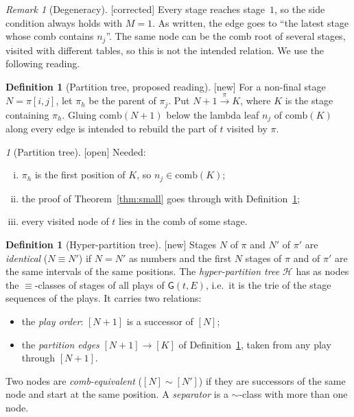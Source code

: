 \documentclass[11pt]{article}
\newcommand{\Gm}{\mathsf{G}}
\newcommand{\iv}[2]{\pi[#1,#2]}
\newcommand{\comb}{\mathrm{comb}}
\newcommand{\ra}[1]{\xrightarrow{#1}}
\newcommand{\Fixed}{\textsf{[corrected]}}
\newcommand{\New}{\textsf{[new]}}
\newcommand{\Open}{\textsf{\color{red!60!black}[open]}}
\theoremstyle{plain}
\theoremstyle{definition}
\newtheorem{definition}[theorem]{Definition}
\theoremstyle{remark}
\newtheorem{remark}[theorem]{Remark}
\newtheorem*{gapenv}{\gapname}
\newcommand{\gapname}{Gap}
\begin{document}
\begin{remark}[Degeneracy]\label{rem:ptree}
\Fixed{} Every stage reaches stage~$1$, so the side condition always
holds with $M=1$.  As written, the edge goes to ``the latest stage whose
comb contains $n_j$''.  The same node can be the comb root of several
stages, visited with different tables, so this is not the intended
relation.  We use the following reading.
\end{remark}

\begin{definition}[Partition tree, proposed reading]\label{def:ptree2}
\New{} For a non-final stage $N=\iv ij$, let $\pi_h$ be the parent of
$\pi_j$.  Put $N+1\ra\pi K$, where $K$ is the stage containing $\pi_h$.
Gluing $\comb(N+1)$ below the lambda leaf $n_j$ of $\comb(K)$ along every
edge is intended to rebuild the part of $t$ visited by $\pi$.
\end{definition}

\renewcommand{\gapname}{[Gap-Partition]}
\begin{gapenv}[Partition tree]\label{gap:ptree}
\Open{} Needed:
\begin{enumerate}[(i)]
\item $\pi_h$ is the first position of $K$, so $n_j\in\comb(K)$;
\item the proof of Theorem~\ref{thm:small} goes through with
  Definition~\ref{def:ptree2};
\item every visited node of $t$ lies in the comb of some stage.
\end{enumerate}
\end{gapenv}

\begin{definition}[Hyper-partition tree]\label{def:hyper}
\New{} Stages $N$ of $\pi$ and $N'$ of $\pi'$ are \emph{identical}
($N\equiv N'$) if $N=N'$ as numbers and the first $N$ stages of $\pi$
and of $\pi'$ are the same intervals of the same positions.  The
\emph{hyper-partition tree} $\mathcal H$ has as nodes the
$\equiv$-classes of stages of all plays of $\Gm(t,E)$, i.e.\ it is the
trie of the stage sequences of the plays.  It carries two relations:
\begin{itemize}
\item the \emph{play order}: $[N+1]$ is a successor of $[N]$;
\item the \emph{partition edges} $[N+1]\ra{}[K]$ of
  Definition~\ref{def:ptree2}, taken from any play through $[N+1]$.
\end{itemize}
Two nodes are \emph{comb-equivalent} ($[N]\sim[N']$) if they are
successors of the same node and start at the same position.  A
\emph{separator} is a $\sim$-class with more than one node.
\end{definition}
\end{document}
